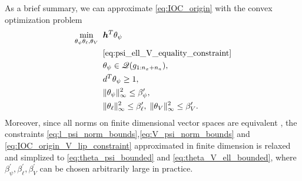 As a brief summary, we can approximate \eqref{eq:IOC_origin} with the convex optimization problem
\begin{subequations}\label{eq:IOC_approx2}
\begin{align}
\min_{\theta_\psi\theta_\ell,\theta_V}&\;\;\bm h^T\theta_\psi\\
&\;\; \eqref{eq:psi_ell_V_equality_constraint}\\
&\;\; \theta_\psi\in\mathscr{Q}(g_{1:n_x+n_a}),\label{eq:theta_psi_constraint}\\
&\;\; d^T\theta_\psi\geq 1,\\
&\;\; \|\theta_\psi\|_{\infty}^2\le \beta_\psi^\prime,\label{eq:theta_psi_bounded}\\
&\;\;\|\theta_\ell\|_{\infty}^2\le \beta_\ell^\prime,\;\|\theta_V\|_{\infty}^2\le \beta_V^\prime.\label{eq:theta_V_ell_bounded}
\end{align}
\end{subequations}
Moreover, since all norms on finite dimensional vector spaces are equivalent \citep[Theorem~2.4-5]{kreyszig1991introductory}, the constraints \eqref{eq:l_psi_norm_bounds},\eqref{eq:V_psi_norm_bounds} and \eqref{eq:IOC_origin_V_lip_constraint} approximated in finite dimension is relaxed and simplized to \eqref{eq:theta_psi_bounded} and \eqref{eq:theta_V_ell_bounded}, where $\beta_\psi^\prime,\beta_\ell^\prime,\beta_V^\prime$ can be chosen arbitrarily large in practice.


